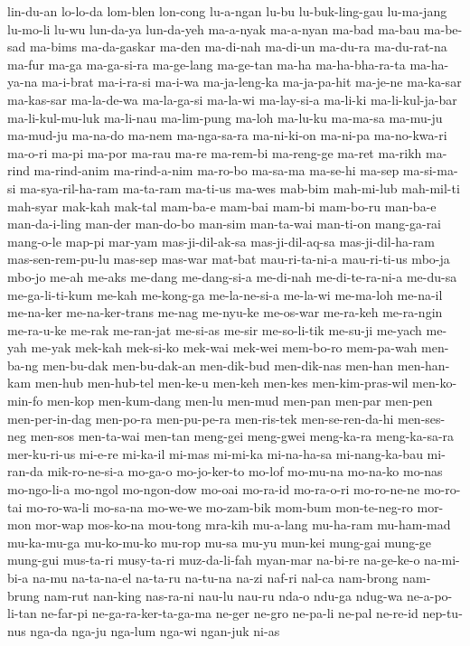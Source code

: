 {lin-du-an lo-lo-da lom-blen lon-cong lu-a-ngan lu-bu lu-buk-ling-gau
lu-ma-jang lu-mo-li lu-wu lun-da-ya lun-da-yeh ma-a-nyak ma-a-nyan ma-bad
ma-bau ma-be-sad ma-bims ma-da-gaskar ma-den ma-di-nah ma-di-un ma-du-ra
ma-du-rat-na ma-fur ma-ga ma-ga-si-ra ma-ge-lang ma-ge-tan ma-ha
ma-ha-bha-ra-ta ma-ha-ya-na ma-i-brat ma-i-ra-si ma-i-wa ma-ja-leng-ka
ma-ja-pa-hit ma-je-ne ma-ka-sar ma-kas-sar ma-la-de-wa ma-la-ga-si
ma-la-wi ma-lay-si-a ma-li-ki ma-li-kul-ja-bar ma-li-kul-mu-luk ma-li-nau
ma-lim-pung ma-loh ma-lu-ku ma-ma-sa ma-mu-ju ma-mud-ju ma-na-do ma-nem
ma-nga-sa-ra ma-ni-ki-on ma-ni-pa ma-no-kwa-ri ma-o-ri ma-pi ma-por ma-rau
ma-re ma-rem-bi ma-reng-ge ma-ret ma-rikh ma-rind ma-rind-anim
ma-rind-a-nim ma-ro-bo ma-sa-ma ma-se-hi ma-sep ma-si-ma-si
ma-sya-ril-ha-ram ma-ta-ram ma-ti-us ma-wes mab-bim mah-mi-lub mah-mil-ti
mah-syar mak-kah mak-tal mam-ba-e mam-bai mam-bi mam-bo-ru man-ba-e
man-da-i-ling man-der man-do-bo man-sim man-ta-wai man-ti-on mang-ga-rai
mang-o-le map-pi mar-yam mas-ji-dil-ak-sa mas-ji-dil-aq-sa
mas-ji-dil-ha-ram mas-sen-rem-pu-lu mas-sep mas-war mat-bat mau-ri-ta-ni-a
mau-ri-ti-us mbo-ja mbo-jo me-ah me-aks me-dang me-dang-si-a me-di-nah
me-di-te-ra-ni-a me-du-sa me-ga-li-ti-kum me-kah me-kong-ga me-la-ne-si-a
me-la-wi me-ma-loh me-na-il me-na-ker me-na-ker-trans me-nag me-nyu-ke
me-os-war me-ra-keh me-ra-ngin me-ra-u-ke me-rak me-ran-jat me-si-as
me-sir me-so-li-tik me-su-ji me-yach me-yah me-yak mek-kah mek-si-ko
mek-wai mek-wei mem-bo-ro mem-pa-wah men-ba-ng men-bu-dak men-bu-dak-an
men-dik-bud men-dik-nas men-han men-han-kam men-hub men-hub-tel men-ke-u
men-keh men-kes men-kim-pras-wil men-ko-min-fo men-kop men-kum-dang men-lu
men-mud men-pan men-par men-pen men-per-in-dag men-po-ra men-pu-pe-ra
men-ris-tek men-se-ren-da-hi men-ses-neg men-sos men-ta-wai men-tan
meng-gei meng-gwei meng-ka-ra meng-ka-sa-ra mer-ku-ri-us mi-e-re mi-ka-il
mi-mas mi-mi-ka mi-na-ha-sa mi-nang-ka-bau mi-ran-da mik-ro-ne-si-a
mo-ga-o mo-jo-ker-to mo-lof mo-mu-na mo-na-ko mo-nas mo-ngo-li-a mo-ngol
mo-ngon-dow mo-oai mo-ra-id mo-ra-o-ri mo-ro-ne-ne mo-ro-tai mo-ro-wa-li
mo-sa-na mo-we-we mo-zam-bik mom-bum mon-te-neg-ro mor-mon mor-wap
mos-ko-na mou-tong mra-kih mu-a-lang mu-ha-ram mu-ham-mad mu-ka-mu-ga
mu-ko-mu-ko mu-rop mu-sa mu-yu mun-kei mung-gai mung-ge mung-gui mus-ta-ri
musy-ta-ri muz-da-li-fah myan-mar na-bi-re na-ge-ke-o na-mi-bi-a na-mu
na-ta-na-el na-ta-ru na-tu-na na-zi naf-ri nal-ca nam-brong nam-brung
nam-rut nan-king nas-ra-ni nau-lu nau-ru nda-o ndu-ga ndug-wa
ne-a-po-li-tan ne-far-pi ne-ga-ra-ker-ta-ga-ma ne-ger ne-gro ne-pa-li
ne-pal ne-re-id nep-tu-nus nga-da nga-ju nga-lum nga-wi ngan-juk ni-as
}
